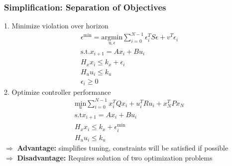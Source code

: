 \subsubsection{Simplification: Separation of Objectives}
1. Minimize violation over horizon
\begin{gather*}
\epsilon^{\mathrm{min}}= \underset{\mathrm{u},\epsilon}{\mathrm{argmin}}\sum^{N-1}_{i=0} \epsilon^T_i S \epsilon + v^T \epsilon_i\\
\mathrm{s.t.} x_{i+1} = Ax_i + Bu_i\\
H_x x_i \leq k_x + \epsilon_i\\
H_u u_i \leq k_u\\
\epsilon_i \geq 0
\end{gather*}
2. Optimize controller performance
\begin{gather*}
    \underset{\mathrm{u}}{\mathrm{min}}\sum^{N-1}_{i=0} x_i^T Qx_i + u_i^T R u_i + x_N^T P x_N\\
    \mathrm{s.t} x_{i+1} = Ax_i + Bu_i \\
    H_x x_i \leq k_x + \epsilon^\mathrm{min}_i\\
    H_u u_i \leq k_u
\end{gather*}
$\Rightarrow$ \textbf{Advantage:} simplifies tuning, constraints will be satisfied if possible\\
$\Rightarrow$ \textbf{Disadvantage:} Requires solution of two optimization problems
